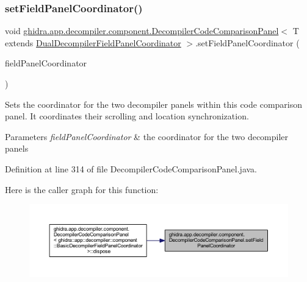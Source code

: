 \subsubsection{\texorpdfstring{setFieldPanelCoordinator()}{setFieldPanelCoordinator()}}
{\footnotesize\ttfamily void \mbox{\hyperlink{classghidra_1_1app_1_1decompiler_1_1component_1_1_decompiler_code_comparison_panel}{ghidra.\+app.\+decompiler.\+component.\+Decompiler\+Code\+Comparison\+Panel}}$<$ T extends \mbox{\hyperlink{classghidra_1_1app_1_1decompiler_1_1component_1_1_dual_decompiler_field_panel_coordinator}{Dual\+Decompiler\+Field\+Panel\+Coordinator}} $>$.set\+Field\+Panel\+Coordinator (\begin{DoxyParamCaption}\item[{\mbox{\hyperlink{classghidra_1_1app_1_1decompiler_1_1component_1_1_dual_decompiler_field_panel_coordinator}{Dual\+Decompiler\+Field\+Panel\+Coordinator}}}]{field\+Panel\+Coordinator }\end{DoxyParamCaption})\hspace{0.3cm}{\ttfamily [inline]}}

Sets the coordinator for the two decompiler panels within this code comparison panel. It coordinates their scrolling and location synchronization. 
\begin{DoxyParams}{Parameters}
{\em field\+Panel\+Coordinator} & the coordinator for the two decompiler panels \\
\hline
\end{DoxyParams}


Definition at line 314 of file Decompiler\+Code\+Comparison\+Panel.\+java.

Here is the caller graph for this function\+:
\nopagebreak
\begin{figure}[H]
\begin{center}
\leavevmode
\includegraphics[width=350pt]{classghidra_1_1app_1_1decompiler_1_1component_1_1_decompiler_code_comparison_panel_ad5ae2c6ce9078500f2777dfae56c5312_icgraph}
\end{center}
\end{figure}
\mbox{\label{classghidra_1_1app_1_1decompiler_1_1component_1_1_decompiler_code_comparison_panel_a1504b8e552aff24d2870261c52ef478a}} 
